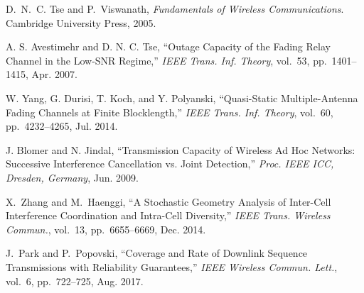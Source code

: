\documentclass[conference]{IEEEtran}
\begin{document}
\begin{thebibliography}{10}
D.~N.~C. Tse and P.~Viswanath, {\em {Fundamentals of Wireless Communications}}.
\newblock Cambridge University Press, 2005.

{A. S. Avestimehr and D. N. C. Tse}, ``{Outage Capacity of the Fading Relay
  Channel in the Low-SNR Regime},'' {\em IEEE Trans. Inf. Theory}, vol.~53,
  pp.~1401--1415, Apr. 2007.

{W. Yang, G. Durisi, T. Koch, and Y. Polyanski}, ``{Quasi-Static
  Multiple-Antenna Fading Channels at Finite Blocklength},'' {\em IEEE Trans.
  Inf. Theory}, vol.~60, pp.~4232--4265, Jul. 2014.

{J. Blomer and N. Jindal}, ``{Transmission Capacity of Wireless Ad Hoc
  Networks: Successive Interference Cancellation vs. Joint Detection},'' {\em
  Proc. IEEE ICC, Dresden, Germany}, Jun. 2009.

X.~Zhang and M.~Haenggi, ``{A Stochastic Geometry Analysis of Inter-Cell
  Interference Coordination and Intra-Cell Diversity},'' {\em IEEE Trans.
  Wireless Commun.}, vol.~13, pp.~6655--6669, Dec. 2014.

J.~Park and P.~Popovski, ``{Coverage and Rate of Downlink Sequence
  Transmissions with Reliability Guarantees},'' {\em IEEE Wireless Commun.
  Lett.}, vol.~6, pp.~722--725, Aug. 2017.

\end{thebibliography}
\end{document}
